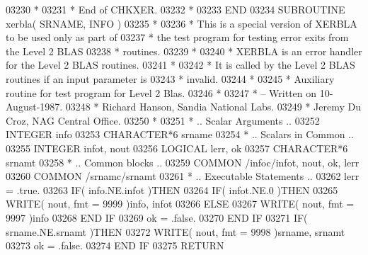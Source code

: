 \begin{DoxyCode}
03230 \textcolor{comment}{*}
03231 \textcolor{comment}{*     End of CHKXER.}
03232 \textcolor{comment}{*}
03233 \textcolor{keyword}{      END}
03234 \textcolor{keyword}{      SUBROUTINE }xerbla( SRNAME, INFO )
03235 \textcolor{comment}{*}
03236 \textcolor{comment}{*  This is a special version of XERBLA to be used only as part of}
03237 \textcolor{comment}{*  the test program for testing error exits from the Level 2 BLAS}
03238 \textcolor{comment}{*  routines.}
03239 \textcolor{comment}{*}
03240 \textcolor{comment}{*  XERBLA  is an error handler for the Level 2 BLAS routines.}
03241 \textcolor{comment}{*}
03242 \textcolor{comment}{*  It is called by the Level 2 BLAS routines if an input parameter is}
03243 \textcolor{comment}{*  invalid.}
03244 \textcolor{comment}{*}
03245 \textcolor{comment}{*  Auxiliary routine for test program for Level 2 Blas.}
03246 \textcolor{comment}{*}
03247 \textcolor{comment}{*  -- Written on 10-August-1987.}
03248 \textcolor{comment}{*     Richard Hanson, Sandia National Labs.}
03249 \textcolor{comment}{*     Jeremy Du Croz, NAG Central Office.}
03250 \textcolor{comment}{*}
03251 \textcolor{comment}{*     .. Scalar Arguments ..}
03252       \textcolor{keywordtype}{INTEGER}            info
03253       \textcolor{keywordtype}{CHARACTER*6}        srname
03254 \textcolor{comment}{*     .. Scalars in Common ..}
03255       \textcolor{keywordtype}{INTEGER}            infot, nout
03256       \textcolor{keywordtype}{LOGICAL}            lerr, ok
03257       \textcolor{keywordtype}{CHARACTER*6}        srnamt
03258 \textcolor{comment}{*     .. Common blocks ..}
03259       \textcolor{keyword}{COMMON}             /infoc/infot, nout, ok, lerr
03260       \textcolor{keyword}{COMMON}             /srnamc/srnamt
03261 \textcolor{comment}{*     .. Executable Statements ..}
03262       lerr = .true.
03263       \textcolor{keywordflow}{IF}( info.NE.infot )\textcolor{keywordflow}{THEN}
03264          \textcolor{keywordflow}{IF}( infot.NE.0 )\textcolor{keywordflow}{THEN}
03265             \textcolor{keyword}{WRITE}( nout, fmt = 9999 )info, infot
03266          \textcolor{keywordflow}{ELSE}
03267             \textcolor{keyword}{WRITE}( nout, fmt = 9997 )info
03268 \textcolor{keywordflow}{         END IF}
03269          ok = .false.
03270 \textcolor{keywordflow}{      END IF}
03271       \textcolor{keywordflow}{IF}( srname.NE.srnamt )\textcolor{keywordflow}{THEN}
03272          \textcolor{keyword}{WRITE}( nout, fmt = 9998 )srname, srnamt
03273          ok = .false.
03274 \textcolor{keywordflow}{      END IF}
03275       \textcolor{keywordflow}{RETURN}

\end{DoxyCode}
